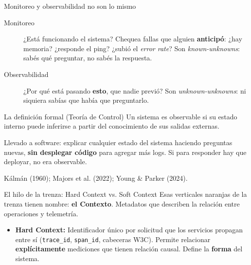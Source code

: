 \documentclass[institutional,screen,none]{../cls/ua-engineering-v6-beamer}
\begin{document}
\begin{frame}{Monitoreo y observabilidad no son lo mismo}

\begin{description}
\item[Monitoreo] ¿Está funcionando el sistema? Chequea fallas que alguien \textbf{anticipó}: ¿hay memoria? ¿responde el ping? ¿subió el \emph{error rate}? Son \emph{known-unknowns}: sabés qué preguntar, no sabés la respuesta.
\pause
\item[Observabilidad] ¿Por qué está pasando \textbf{esto}, que nadie previó? Son \emph{unknown-unknowns}: ni siquiera sabías que había que preguntarlo.
\end{description}

\pause

\begin{block}{La definición formal (Teoría de Control)}
Un sistema es observable si su estado interno puede inferirse a partir del conocimiento de sus salidas externas.
\end{block}

\pause

{\small Llevado a software: explicar cualquier estado del sistema haciendo preguntas nuevas, \textbf{sin desplegar código} para agregar más logs. Si para responder hay que deployar, no era observable.}

{\scriptsize\color{UAIngMuted}Kálmán (1960); Majors et al. (2022); Young \& Parker (2024).}
\end{frame}


\begin{frame}{El hilo de la trenza: Hard Context vs. Soft Context}
Esas verticales naranjas de la trenza tienen nombre: \textbf{el Contexto}. Metadatos que describen la relación entre operaciones y telemetría.

\pause


\begin{itemize}
\item \textbf{Hard Context:} Identificador único por solicitud que los servicios propagan entre sí (\texttt{trace\_id}, \texttt{span\_id}, cabeceras W3C). Permite relacionar \textbf{explícitamente} mediciones que tienen relación causal. Define la \textbf{forma} del sistema.
\end{itemize}
\end{frame}
\end{document}
